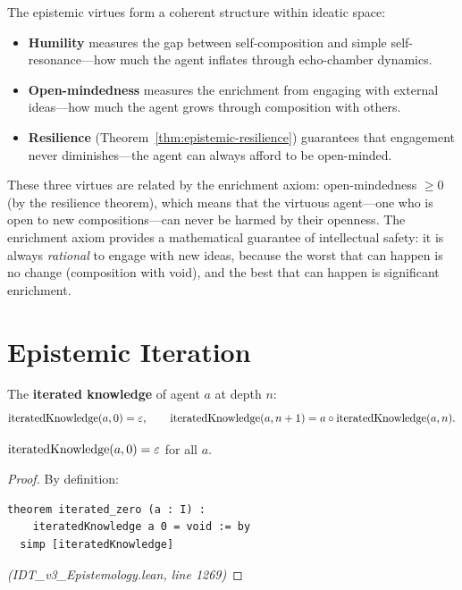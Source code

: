 \begin{remark}
The epistemic virtues form a coherent structure within ideatic space:

\begin{itemize}
\item \textbf{Humility} measures the gap between self-composition and simple
  self-resonance---how much the agent inflates through echo-chamber dynamics.
\item \textbf{Open-mindedness} measures the enrichment from engaging with
  external ideas---how much the agent grows through composition with others.
\item \textbf{Resilience} (Theorem~\ref{thm:epistemic-resilience}) guarantees
  that engagement never diminishes---the agent can always afford to be open-minded.
\end{itemize}

These three virtues are related by the enrichment axiom: open-mindedness $\geq 0$
(by the resilience theorem), which means that the virtuous agent---one who is
open to new compositions---can never be harmed by their openness. The enrichment
axiom provides a mathematical guarantee of intellectual safety: it is always
\emph{rational} to engage with new ideas, because the worst that can happen is
no change (composition with void), and the best that can happen is significant
enrichment.
\end{remark}

\section{Epistemic Iteration}

\begin{definition}
\label{def:iterated-knowledge}
The \textbf{iterated knowledge} of agent $a$ at depth $n$:
\[
  \mathrm{iteratedKnowledge}(a, 0) = \varepsilon, \qquad
  \mathrm{iteratedKnowledge}(a, n+1) = a \circ \mathrm{iteratedKnowledge}(a, n).
\]
\end{definition}

\begin{theorem}
\label{thm:iterated-zero}
$\mathrm{iteratedKnowledge}(a, 0) = \varepsilon$ for all $a$.
\end{theorem}

\begin{proof}
By definition:
\begin{lstlisting}
theorem iterated_zero (a : I) :
    iteratedKnowledge a 0 = void := by
  simp [iteratedKnowledge]
\end{lstlisting}
\textit{(IDT\_v3\_Epistemology.lean, line 1269)}
\end{proof}

